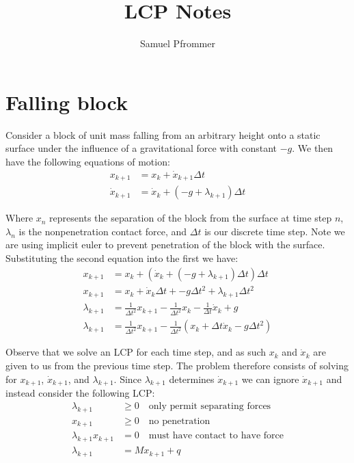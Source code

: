 \documentclass{article}
\begin{document}
\title{LCP Notes}
\author{Samuel Pfrommer}

\maketitle

\section{Falling block}
Consider a block of unit mass falling from an arbitrary height onto a static surface under the influence of a gravitational force with constant $-g$. We then have the following equations of motion:
\begin{align*}
    x_{k+1} &= x_k + \dot x_{k+1} \Delta t \\
    \dot x_{k+1} &= \dot x_k + (-g + \lambda _{k+1}) \Delta t
\end{align*}

Where $x_n$ represents the separation of the block from the surface at time step $n$, $\lambda_n$ is the nonpenetration contact force, and $\Delta t$ is our discrete time step. Note we are using implicit euler to prevent penetration of the block with the surface. Substituting the second equation into the first we have:
\begin{align*}
    x_{k+1} &= x_k + (\dot x_k + (-g + \lambda _{k+1}) \Delta t) \Delta t \\
    x_{k+1} &= x_k + \dot x_k \Delta t + -g \Delta t ^2 + \lambda _{k+1} \Delta t ^2 \\
    \lambda_{k+1} &= \frac{1}{\Delta t^2} x_{k+1} - \frac{1}{\Delta t^2} x_k - \frac{1}{\Delta t} \dot x_k + g \\
    \lambda_{k+1} &= \frac{1}{\Delta t^2} x_{k+1} - \frac{1}{\Delta t^2} (x_k + \Delta t \dot x_k - g \Delta t^2)
\end{align*}

Observe that we solve an LCP for each time step, and as such $x_k$ and $\dot x_k$ are given to us from the previous time step. The problem therefore consists of solving for $x_{k+1}$, $\dot x_{k+1}$, and $\lambda_{k+1}$. Since $\lambda_{k+1}$ determines $\dot x_{k+1}$ we can ignore $\dot x_{k+1}$ and instead consider the following LCP:
\begin{align*}
    \lambda_{k+1} &\geq 0 \quad \textrm{only permit separating forces}\\
    x_{k+1} &\geq 0 \quad \textrm{no penetration}\\
    \lambda_{k+1} x_{k+1}&= 0 \quad \textrm{must have contact to have force}\\
    \lambda_{k+1} &= M x_{k+1} + q
\end{align*}
\end{document}
